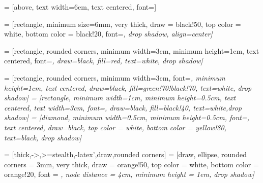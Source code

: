   = [above, 
 					  text width=6em, 
                      text centered,
                      font=\normalsize]

 = [rectangle,
                     minimum size=6mm,%
					 very thick,
                     draw = black!50, 
                     top color = white,
                     bottom color = black!20,
                     font=\itshape\footnotesize,
                     drop shadow, 
                     align=center]
                     
 = [rectangle, 
					rounded corners, 
                    minimum width=3cm, 
                    minimum height=1cm,
                    text centered,
                    font=\itshape\footnotesize, 
                    draw=black, 
                    fill=red, 
                    text=white,  
                    drop shadow]
                    
 = [rectangle, 
					   rounded corners, 
                       minimum width=3cm, 
                       font=\itshape\footnotesize,
                       minimum height=1cm,
                       text centered, 
                       draw=black,
                       fill=green!70!black!70, 
                       text=white,  
                       drop shadow]
 = [rectangle, 
					   minimum width=1cm, 
                       minimum height=0.5cm, 
                       text centered, 
                       text width=3cm, 
                       font=\itshape\footnotesize,
                       draw=black, 
                       fill=black!40, 
                       text=white,drop shadow]
 = [diamond, 
						minimum width=0.5cm, 
                        minimum height=0.5cm,
                        font=\itshape\footnotesize,
						text centered, 
                        draw=black,
						top color = white,
                        bottom color = yellow!80, 
                        text=black, 
                        drop shadow]
                        
 = [thick,->,>=stealth,-latex',draw,rounded corners]
 = [draw, 
					 ellipse,
					 rounded corners = 3mm,
                     very thick,
                     draw           = orange!50, 
                     top color      = white,
                     bottom color   = orange!20,
                     font           = \itshape\footnotesize,
                     node distance  = 4cm,
                     minimum height = 1em,
                     drop shadow]


